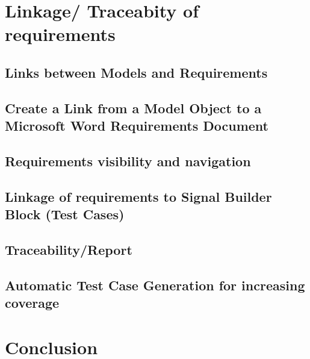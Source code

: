 \section{Linkage/ Traceabity of requirements}


	\subsection{Links between Models and Requirements}
	
	
	\subsection{Create a Link from a Model Object to a Microsoft Word Requirements Document}
	
	
	\subsection{Requirements visibility and navigation}
	
	
	\subsection{Linkage of requirements to Signal Builder Block (Test Cases)}
	
	
	
	\subsection{Traceability/Report}
	
	
	\subsection{Automatic Test Case Generation for increasing coverage}
	
	
	
\section{Conclusion}